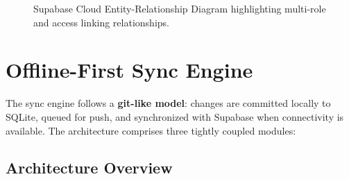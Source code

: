 \documentclass[12pt,a4paper]{article}
\begin{document}
\begin{figure}[H]
{
}
\caption{Supabase Cloud Entity-Relationship Diagram highlighting multi-role and access linking relationships.}
\end{figure}

\section{Offline-First Sync Engine}

The sync engine follows a \textbf{git-like model}: changes are committed locally to SQLite, queued for push, and synchronized with Supabase when connectivity is available. The architecture comprises three tightly coupled modules:

\subsection{Architecture Overview}
\end{document}
